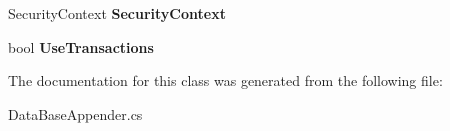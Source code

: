 \begin{DoxyCompactItemize}
\item 
\hypertarget{class_krs_1_1_base_1_1_logs_1_1_data_base_appender_a52c54b3e3fbb5af87cf122bbdf2e302e}{Security\-Context {\bfseries Security\-Context}}\label{class_krs_1_1_base_1_1_logs_1_1_data_base_appender_a52c54b3e3fbb5af87cf122bbdf2e302e}

\item 
\hypertarget{class_krs_1_1_base_1_1_logs_1_1_data_base_appender_a8f8ea5bc04adfbdb4e47fe71f51cf533}{bool {\bfseries Use\-Transactions}}\label{class_krs_1_1_base_1_1_logs_1_1_data_base_appender_a8f8ea5bc04adfbdb4e47fe71f51cf533}

\end{DoxyCompactItemize}


The documentation for this class was generated from the following file\-:\begin{DoxyCompactItemize}
\item 
Data\-Base\-Appender.\-cs\end{DoxyCompactItemize}
